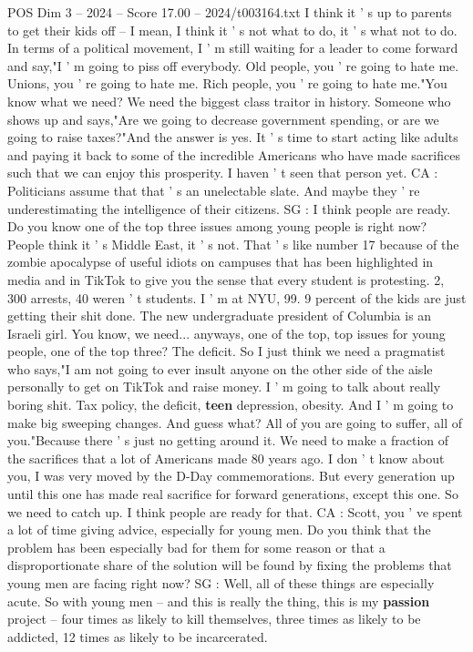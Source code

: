 \begin{textsample}{POS Dim 3 – 2024 – Score 17.00 – 2024/t003164.txt}
I think it ' s up to parents to get their kids off -- I mean, I think it ' s not what to do, it ' s what not to do.
In terms of a political movement, I ' m still waiting for a leader to come forward and say,"I ' m going to piss off everybody.
Old people, you ' re going to hate me.
Unions, you ' re going to hate me.
Rich people, you ' re going to hate me."You know what we need?
We need the biggest class traitor in history.
Someone who shows up and says,"Are we going to decrease government spending, or are we going to raise taxes?"And the answer is yes.
It ' s time to start acting like adults and paying it back to some of the incredible Americans who have made sacrifices such that we can enjoy this prosperity.
I haven ' t seen that person yet.
CA : Politicians assume that that ' s an unelectable slate.
And maybe they ' re underestimating the intelligence of their citizens.
SG : I think people are ready.
Do you know one of the top three issues among young people is right now?
People think it ' s Middle East, it ' s not.
That ' s like number 17 because of the zombie apocalypse of useful idiots on campuses that has been highlighted in media and in TikTok to give you the sense that every student is protesting. 2, 300 arrests, 40 weren ' t students.
I ' m at NYU, 99. 9 percent of the kids are just getting their shit done.
The new undergraduate president of Columbia is an Israeli girl.
You know, we need... anyways, one of the top, top issues for young people, one of the top three?
The deficit.
So I just think we need a pragmatist who says,"I am not going to ever insult anyone on the other side of the aisle personally to get on TikTok and raise money.
I ' m going to talk about really boring shit.
Tax policy, the deficit, \textbf{teen} depression, obesity.
And I ' m going to make big sweeping changes.
And guess what?
All of you are going to suffer, all of you."Because there ' s just no getting around it.
We need to make a fraction of the sacrifices that a lot of Americans made 80 years ago.
I don ' t know about you, I was very moved by the D-Day commemorations.
But every generation up until this one has made real sacrifice for forward generations, except this one.
So we need to catch up.
I think people are ready for that.
CA : Scott, you ' ve spent a lot of time giving advice, especially for young men.
Do you think that the problem has been especially bad for them for some reason or that a disproportionate share of the solution will be found by fixing the problems that young men are facing right now?
SG : Well, all of these things are especially acute.
So with young men -- and this is really the thing, this is my \textbf{passion} project -- four times as likely to kill themselves, three times as likely to be addicted, 12 times as likely to be incarcerated.

\end{textsample}
